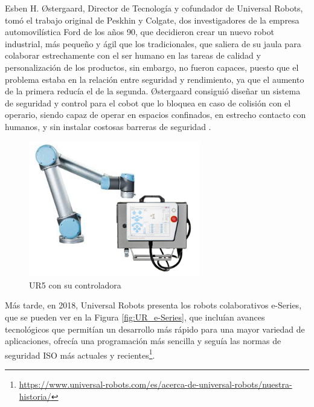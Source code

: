 Esben H. Østergaard, Director de Tecnología y cofundador de Universal Robots, tomó el trabajo original de Peskhin y Colgate, dos investigadores de la empresa automovilística Ford de los años 90, que decidieron crear un nuevo robot industrial, más pequeño y ágil que los tradicionales, que saliera de su jaula para colaborar estrechamente con el ser humano en las tareas de calidad y personalización de los productos, sin embargo, no fueron capaces, puesto que el problema estaba en la relación entre seguridad y rendimiento, ya que el aumento de la primera reducía el de la segunda. Østergaard consiguió diseñar un sistema de seguridad y control para el cobot que lo bloquea en caso de colisión con el operario, %
siendo capaz de operar en espacios confinados, en estrecho contacto con humanos, y sin instalar costosas barreras de seguridad \cite{Cusano22}.
  
  \begin{figure} [H]
    \begin{center}
      \includegraphics[width=75mm]{figs/UR5_controller.png}
    \end{center}
    \caption{UR5 con su controladora}
    \label{fig:UR5}
  \end{figure}
  
Más tarde, en 2018, Universal Robots presenta los robots colaborativos e-Series, que se pueden ver en la Figura \ref{fig:UR_e-Series}, que incluían avances tecnológicos que permitían un desarrollo más rápido para una mayor variedad de aplicaciones, ofrecía una programación más sencilla y seguía las normas de seguridad ISO más actuales y recientes\footnote{\url{https://www.universal-robots.com/es/acerca-de-universal-robots/nuestra-historia/}}.
 
